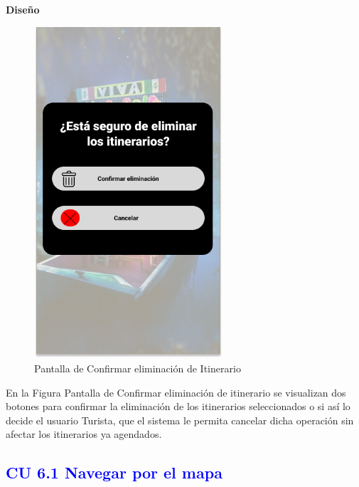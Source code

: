 \textbf{Diseño}
\begin{figure}[h]
        \centering
        \includegraphics[width= 7cm]{Pantallas Prototipo3/IU31 Pantalla Eliminar Itinerario.jpg}
        \caption{Pantalla de Confirmar eliminación de Itinerario}
        \label{fig:enter-label}
    \end{figure}
 

En la Figura Pantalla de Confirmar eliminación de itinerario se visualizan dos botones para confirmar la eliminación de los itinerarios seleccionados o si así lo decide el usuario Turista, que el sistema le permita cancelar dicha operación sin afectar los itinerarios ya agendados. 


\newpage




\subsection{\textcolor{blue}{CU 6.1 Navegar por el mapa}}
